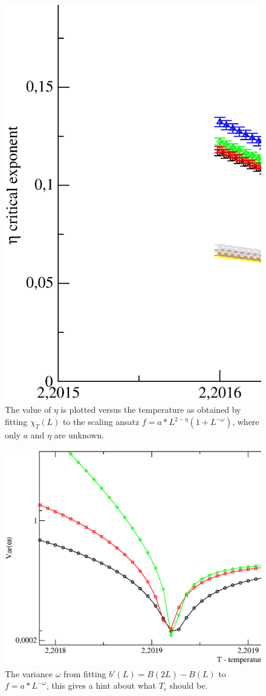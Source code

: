 \begin{figure}[!htpb]
  \centering
  \includegraphics[width=\textwidth]{./plots/3DXY/vsT/eta.eps}
  \caption{The value of $\eta$ is plotted versus the temperature as obtained by fitting $\chi_T(L)$ to the scaling ansatz $f = a*L^{2-\eta}(1+L^{-\omega})$, where only $a$ and $\eta$ are unknown.  }
\end{figure}


\begin{figure}[!htpb]
  \centering
  \includegraphics[width=\textwidth]{./plots/3DXY/vsT/variace_omega.eps}
  \caption{The variance $\omega$ from fitting $b'(L) = B(2L)-B(L)$ to $f = a*L^{-\omega}$, this gives a hint about what $T_c$ should be.}
\end{figure}
